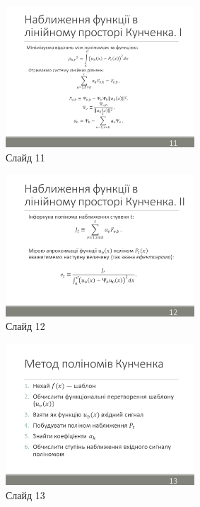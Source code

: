 \documentclass[pdftex]{thesis_utf8}
\begin{document}
\begin{figure}[h]
    \centering
    \includegraphics[width=0.63\textwidth]{slides/slide11.png}
    \caption{Слайд 11}
\end{figure}

\begin{figure}[h]
    \centering
    \includegraphics[width=0.63\textwidth]{slides/slide12.png}
    \caption{Слайд 12}
\end{figure}
\clearpage

\begin{figure}[h]
    \centering
    \includegraphics[width=0.63\textwidth]{slides/slide13.png}
    \caption{Слайд 13}
\end{figure}
\end{document}
